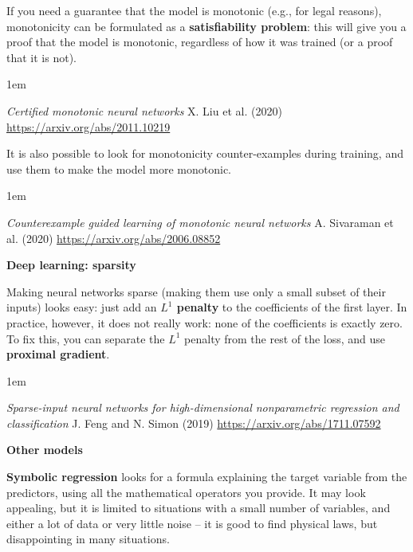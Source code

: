 \documentclass[a5paper]{article}
\let\d\textbf
\newenvironment{reference}{%
  \medskip\goodbreak
  \parskip 0pt
  \raggedright
  \leftskip 1em
  \obeylines
}{\par\medskip\goodbreak}
\def\subsection#1{{\par\bigskip\goodbreak\large\bfseries #1\par}}
\begin{document}
If you need a guarantee that the model is monotonic
(e.g., for legal reasons), monotonicity can be formulated as a \d{satisfiability problem}:
this will give you a proof that the model is monotonic, regardless of how it was trained
(or a proof that it is not).

\begin{reference}
  \emph{Certified monotonic neural networks}
  X. Liu et al. (2020)
  \url{https://arxiv.org/abs/2011.10219}
\end{reference}

It is also possible to look for monotonicity counter-examples during training,
and use them to make the model more monotonic.

\begin{reference}
  \emph{Counterexample guided learning of monotonic neural networks}
  A. Sivaraman et al. (2020)
  \url{https://arxiv.org/abs/2006.08852}
\end{reference}

\subsection{Deep learning: sparsity}

Making neural networks sparse (making them use only a small subset of their inputs)
looks easy: just add an \d{$L^1$ penalty} to the coefficients of the first layer.
In practice, however, it does not really work: none of the coefficients is exactly zero.
To fix this, you can separate the $L^1$ penalty from the rest of the loss,
and use \d{proximal gradient}. 

\begin{reference}
  \emph{Sparse-input neural networks for high-dimensional nonparametric regression and classification}
  J. Feng and N. Simon (2019)
  \url{https://arxiv.org/abs/1711.07592}
\end{reference}

\subsection{Other models}

\d{Symbolic regression} looks for a formula explaining the target variable from the predictors,
using all the mathematical operators you provide. It may look appealing,
but it is limited to situations with a small number of variables,
and either a lot of data or very little noise -- it is good to find physical laws,
but disappointing in many situations. 
\end{document}
